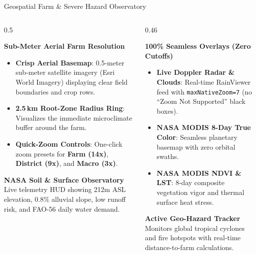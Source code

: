 \documentclass[aspectratio=169,10pt]{beamer}
\begin{document}
\begin{frame}{Geospatial Farm \& Severe Hazard Observatory}
    \begin{columns}[T]
        \begin{column}{0.5\textwidth}
            \begin{block}{\textbf{Sub-Meter Aerial Farm Resolution}}
                \footnotesize
                \begin{itemize}
                    \item \textbf{Crisp Aerial Basemap}: 0.5-meter sub-meter satellite imagery (Esri World Imagery) displaying clear field boundaries and crop rows.
                    \item \textbf{2.5\,km Root-Zone Radius Ring}: Visualizes the immediate microclimate buffer around the farm.
                    \item \textbf{Quick-Zoom Controls}: One-click zoom presets for \textbf{Farm (14x)}, \textbf{District (9x)}, and \textbf{Macro (3x)}.
                \end{itemize}
            \end{block}
            \vspace{0.2cm}
            \begin{block}{\textbf{NASA Soil \& Surface Observatory}}
                \scriptsize
                Live telemetry HUD showing 212m ASL elevation, 0.8\% alluvial slope, low runoff risk, and FAO-56 daily water demand.
            \end{block}
        \end{column}
        \begin{column}{0.46\textwidth}
            \begin{exampleblock}{\textbf{100\% Seamless Overlays (Zero Cutoffs)}}
                \footnotesize
                \begin{itemize}
                    \item \textbf{Live Doppler Radar \& Clouds}: Real-time RainViewer feed with \texttt{maxNativeZoom=7} (no ``Zoom Not Supported'' black boxes).
                    \item \textbf{NASA MODIS 8-Day True Color}: Seamless planetary basemap with zero orbital swaths.
                    \item \textbf{NASA MODIS NDVI \& LST}: 8-day composite vegetation vigor and thermal surface heat stress.
                \end{itemize}
            \end{exampleblock}
            \vspace{0.2cm}
            \begin{alertblock}{\textbf{Active Geo-Hazard Tracker}}
                \scriptsize
                Monitors global tropical cyclones and fire hotspots with real-time distance-to-farm calculations.
            \end{alertblock}
        \end{column}
    \end{columns}
\end{frame}
\end{document}
